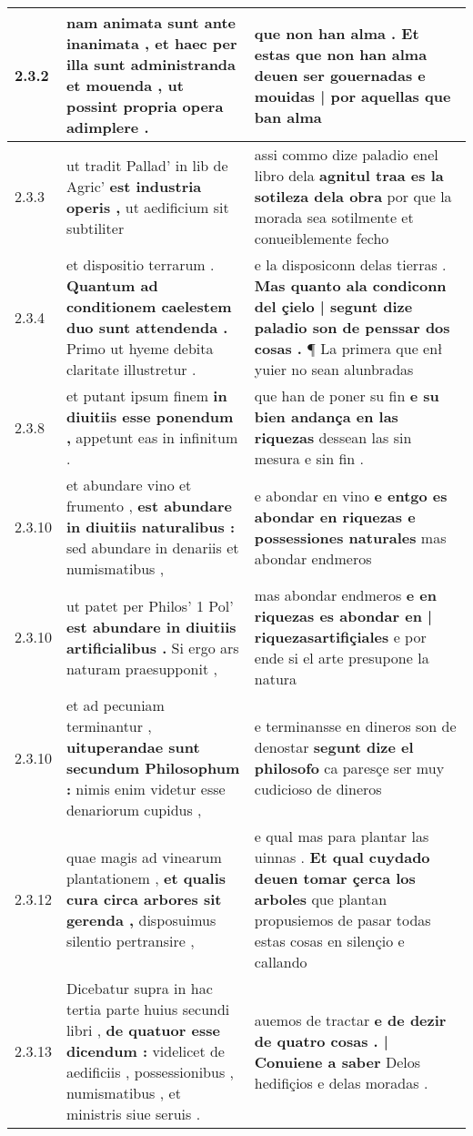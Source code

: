 \begin{tabular}{|p{1cm}|p{6.5cm}|p{6.5cm}|}
2.3.2 & nam animata sunt ante inanimata , \textbf{ et haec per illa sunt administranda et mouenda , } ut possint propria opera adimplere . & que non han alma . \textbf{ Et estas que non han alma deuen ser gouernadas e mouidas | por aquellas } que ban alma \\\hline
2.3.3 & ut tradit Pallad’ in lib de Agric’ \textbf{ est industria operis , } ut aedificium sit subtiliter & assi commo dize paladio enel libro dela \textbf{ agnitul traa es la sotileza dela obra } por que la morada sea sotilmente et conueiblemente fecho \\\hline
2.3.4 & et dispositio terrarum . \textbf{ Quantum ad conditionem caelestem duo sunt attendenda . } Primo ut hyeme debita claritate illustretur . & e la disposiconn delas tierras . \textbf{ Mas quanto ala condiconn del çielo | segunt dize paladio son de penssar dos cosas . } ¶ La primera que enł yuier no sean alunbradas \\\hline
2.3.8 & et putant ipsum finem \textbf{ in diuitiis esse ponendum , } appetunt eas in infinitum . & que han de poner su fin \textbf{ e su bien andança en las riquezas } dessean las sin mesura e sin fin . \\\hline
2.3.10 & et abundare vino et frumento , \textbf{ est abundare in diuitiis naturalibus : } sed abundare in denariis et numismatibus , & e abondar en vino \textbf{ e entgo es abondar en riquezas e possessiones naturales } mas abondar endmeros \\\hline
2.3.10 & ut patet per Philos’ 1 Pol’ \textbf{ est abundare in diuitiis artificialibus . } Si ergo ars naturam praesupponit , & mas abondar endmeros \textbf{ e en riquezas es abondar en | riquezasartifiçiales } e por ende si el arte presupone la natura \\\hline
2.3.10 & et ad pecuniam terminantur , \textbf{ uituperandae sunt secundum Philosophum : } nimis enim videtur esse denariorum cupidus , & e terminansse en dineros son de denostar \textbf{ segunt dize el philosofo } ca paresçe ser muy cudicioso de dineros \\\hline
2.3.12 & quae magis ad vinearum plantationem , \textbf{ et qualis cura circa arbores sit gerenda , } disposuimus silentio pertransire , & e qual mas para plantar las uinnas . \textbf{ Et qual cuydado deuen tomar çerca los arboles } que plantan propusiemos de pasar todas estas cosas en silençio e callando \\\hline
2.3.13 & Dicebatur supra in hac tertia parte huius secundi libri , \textbf{ de quatuor esse dicendum : } videlicet de aedificiis , possessionibus , numismatibus , et ministris siue seruis . & auemos de tractar \textbf{ e de dezir de quatro cosas . | Conuiene a saber } Delos hedifiçios e delas moradas . \\\hline

\end{tabular}
